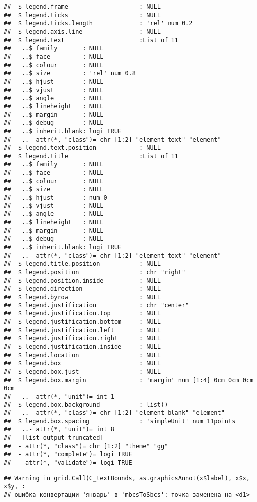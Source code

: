 \documentclass[
]{article}
\begin{document}
\begin{verbatim}
##  $ legend.frame                    : NULL
##  $ legend.ticks                    : NULL
##  $ legend.ticks.length             : 'rel' num 0.2
##  $ legend.axis.line                : NULL
##  $ legend.text                     :List of 11
##   ..$ family       : NULL
##   ..$ face         : NULL
##   ..$ colour       : NULL
##   ..$ size         : 'rel' num 0.8
##   ..$ hjust        : NULL
##   ..$ vjust        : NULL
##   ..$ angle        : NULL
##   ..$ lineheight   : NULL
##   ..$ margin       : NULL
##   ..$ debug        : NULL
##   ..$ inherit.blank: logi TRUE
##   ..- attr(*, "class")= chr [1:2] "element_text" "element"
##  $ legend.text.position            : NULL
##  $ legend.title                    :List of 11
##   ..$ family       : NULL
##   ..$ face         : NULL
##   ..$ colour       : NULL
##   ..$ size         : NULL
##   ..$ hjust        : num 0
##   ..$ vjust        : NULL
##   ..$ angle        : NULL
##   ..$ lineheight   : NULL
##   ..$ margin       : NULL
##   ..$ debug        : NULL
##   ..$ inherit.blank: logi TRUE
##   ..- attr(*, "class")= chr [1:2] "element_text" "element"
##  $ legend.title.position           : NULL
##  $ legend.position                 : chr "right"
##  $ legend.position.inside          : NULL
##  $ legend.direction                : NULL
##  $ legend.byrow                    : NULL
##  $ legend.justification            : chr "center"
##  $ legend.justification.top        : NULL
##  $ legend.justification.bottom     : NULL
##  $ legend.justification.left       : NULL
##  $ legend.justification.right      : NULL
##  $ legend.justification.inside     : NULL
##  $ legend.location                 : NULL
##  $ legend.box                      : NULL
##  $ legend.box.just                 : NULL
##  $ legend.box.margin               : 'margin' num [1:4] 0cm 0cm 0cm 0cm
##   ..- attr(*, "unit")= int 1
##  $ legend.box.background           : list()
##   ..- attr(*, "class")= chr [1:2] "element_blank" "element"
##  $ legend.box.spacing              : 'simpleUnit' num 11points
##   ..- attr(*, "unit")= int 8
##   [list output truncated]
##  - attr(*, "class")= chr [1:2] "theme" "gg"
##  - attr(*, "complete")= logi TRUE
##  - attr(*, "validate")= logi TRUE
\end{verbatim}

\begin{verbatim}
## Warning in grid.Call(C_textBounds, as.graphicsAnnot(x$label), x$x, x$y, :
## ошибка конвертации 'январь' в 'mbcsToSbcs': точка заменена на <d1>
\end{verbatim}
\end{document}
